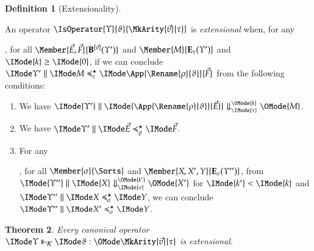 \documentclass[11pt]{article}
\newtheorem{thm}{Theorem}[section]
\theoremstyle{definition}
\newtheorem{definition}[thm]{Definition}
\theoremstyle{notation}
\theoremstyle{remark}
\numberwithin{equation}{section}
\newcommand\EvalN[5]{\IMode{#1}\parallel\IMode{#4}\Downarrow^{\OMode{#3}}_{\IMode{#2}}\OMode{#5}}
\newcommand\Exprs{\mathbf{E}}
\newcommand\BExprs{\mathbf{B}}
\begin{document}
\begin{definition}[Extensionality]
  \label{def:extensionality}

  An operator $\IsOperator{\Upsilon}{\vartheta}{\MkArity{\vec{v}}{\tau}}$ is
  \emph{extensional} when, for any
  , for all $\Member{\vec{E},\vec{F}}{\BExprs^{[\vec{v}]}(\Upsilon')}$ and
  $\Member{M}{\Exprs_\tau(\Upsilon')}$ and $\IMode{k}\geq\IMode{0}$, if we can conclude
  $\PBinRel{\preccurlyeq^\star_\tau}{\Upsilon'}{M}{\App{\Rename{\rho}{\vartheta}}{\vec{F}}}$
  from the following conditions:
  \begin{enumerate}
    \item
      We have $\EvalN{\Upsilon'}{\tau}{k}{\App{\Rename{\rho}{\vartheta}}{\vec{E}}}{M}$.

    \item
      We have $\PBinRel{\preccurlyeq^\star_{\vec{v}}}{\Upsilon'}{\vec{E}}{\vec{F}}$.

    \item
      For any
      , for all $\Member{\sigma}{\Sorts}$ and $\Member{X,X',Y}{\Exprs_\sigma(\Upsilon'')}$,
      from $\EvalN{\Upsilon''}{\sigma}{k'}{X}{X'}$ for $\IMode{k'}<\IMode{k}$ and
      $\PBinRel{\preccurlyeq^\star_\sigma}{\Upsilon''}{X}{Y}$, we can conclude
      $\PBinRel{\preccurlyeq^\star_\sigma}{\Upsilon''}{X'}{Y}$.
  \end{enumerate}

\end{definition}

\begin{thm}
  Every canonical operator
  $\IsCanOperator{\Upsilon}{\vartheta}{\MkArity{\vec{v}}{\tau}}$ is
  extensional.
\end{thm}
\end{document}

